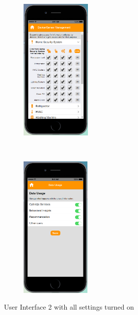 \begin{figure}
\begin{subfigure}[t]{0.19\textwidth}
	\end{subfigure}%
	~~~~~~
	\begin{subfigure}[t]{0.19\textwidth}
		\centering
		\includegraphics[height=2.8in]{figures/ui2allOn3.png}
	\end{subfigure}%
	~~~~~~
	\begin{subfigure}[t]{0.19\textwidth}
		\centering
		\includegraphics[height=2.8in]{figures/ui2allOn4.png}
	\end{subfigure}%
	\caption{User Interface 2 with all settings turned on}
	\label{fig:ui2AllOn}
\end{figure}

